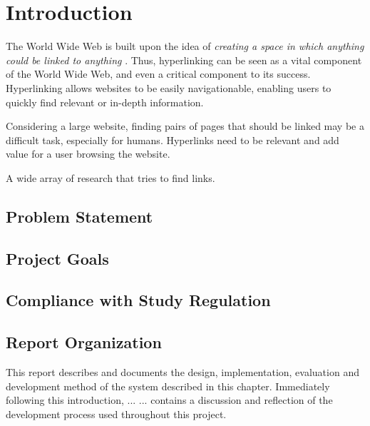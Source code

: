 \chapter{Introduction}
The World Wide Web is built upon the idea of \emph{creating a space in which anything could be linked to anything} . Thus, hyperlinking can be seen as a vital component of the World Wide Web, and even a critical component to its success. Hyperlinking allows websites to be easily navigationable, enabling users to quickly find relevant or in-depth information.

Considering a large website, finding pairs of pages that should be linked may be a difficult task, especially for humans. Hyperlinks need to be relevant and add value for a user browsing the website.

A wide array of research that tries to find links.


\section{Problem Statement}
\dummy

\section{Project Goals}

\section{Compliance with Study Regulation}

\section{Report Organization}
This report describes and documents the design, implementation, evaluation and development method of the system described in this chapter. Immediately following this introduction,  ... \dummy ...  contains a discussion and reflection of the development process used throughout this project.
